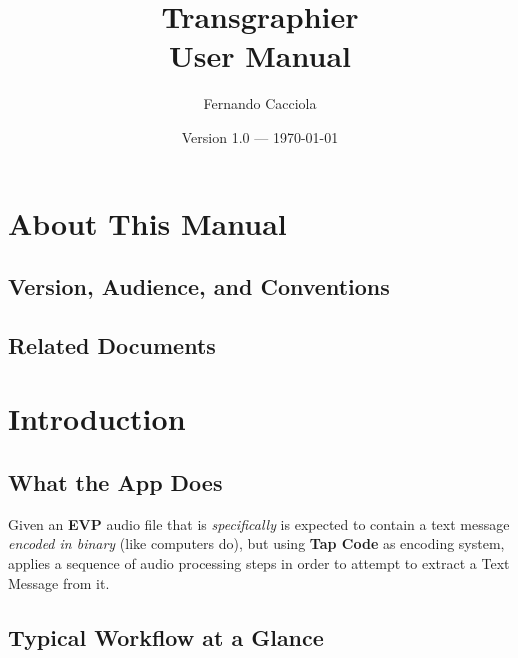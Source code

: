 \documentclass[11pt]{report}
\title{Transgraphier\\{\large User Manual}}
\author{Fernando Cacciola}
\date{Version 1.0 --- \today}
\begin{document}
    \maketitle
    \tableofcontents
    
    \chapter*{About This Manual}
    \section*{Version, Audience, and Conventions}
    
    \section*{Related Documents}
    
    \chapter{Introduction}
    \section{What the App Does}
       
       Given an \textbf{EVP} audio file that is \textit{specifically} is expected
       to contain a text message \textit{encoded in binary} (like computers do),
       but using \textbf{Tap Code} as encoding system, applies a sequence of audio processing steps in order to attempt to extract a Text Message from it.
       
    \section{Typical Workflow at a Glance}
    
\end{document}
